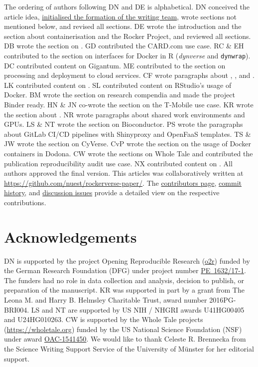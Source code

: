 The ordering of authors following DN and DE is alphabetical. DN
conceived the article idea,
\href{https://github.com/nuest/rockerverse-paper/issues/3}{initialised the formation of the writing team},
wrote sections not mentioned below, and revised all sections. DE wrote
the introduction and the section about containerisation and the Rocker
Project, and reviewed all sections. DB wrote the section on
. GD contributed the CARD.com use case. RC \& EH
contributed to the section on interfaces for Docker in R
(\emph{dynverse} and \texttt{dynwrap}). DC contributed content on
Gigantum. ME contributed to the section on processing and deployment to
cloud services. CF wrote paragraphs about ,
,  and . LK contributed content on
. SL contributed content on RStudio's usage of Docker. BM
wrote the section on research compendia and made the project Binder
ready. HN \& JN co-wrote the section on the T-Mobile use case. KR wrote
the section about . NR wrote paragraphs about shared work
environments and GPUs. LS \& NT wrote the section on Bioconductor. PS
wrote the paragraphs about GitLab CI/CD pipelines with Shinyproxy and
OpenFaaS templates. TS \& JW wrote the section on CyVerse. CvP wrote the
section on the usage of Docker containers in Dodona. CW wrote the
sections on Whole Tale and contributed the publication reproducibility
audit use case. NX contributed content on . All authors
approved the final version. This articles was collaboratively written at
\href{https://github.com/nuest/rockerverse-paper/}{https://github.com/nuest/rockerverse-paper/}.
The
\href{https://github.com/nuest/rockerverse-paper/graphs/contributors}{contributors page},
\href{https://github.com/nuest/rockerverse-paper/commits/master}{commit history},
and
\href{https://github.com/nuest/rockerverse-paper/issues/}{discussion issues}
provide a detailed view on the respective contributions.

\hypertarget{acknowledgements}{%
\section{Acknowledgements}\label{acknowledgements}}

DN is supported by the project Opening Reproducible Research
(\href{https://www.uni-muenster.de/forschungaz/project/12343}{o2r})
funded by the German Research Foundation (DFG) under project number
\href{https://gepris.dfg.de/gepris/projekt/415851837}{PE~1632/17-1}. The
funders had no role in data collection and analysis, decision to
publish, or preparation of the manuscript. KR was supported in part by a
grant from The Leona M. and Harry B. Helmsley Charitable Trust, award
number 2016PG-BRI004. LS and NT are supported by US NIH / NHGRI awards
U41HG00405 and U24HG010263. CW is supported by the Whole Tale projects
(\url{https://wholetale.org}) funded by the US National Science
Foundation (NSF) under award
\href{https://www.nsf.gov/awardsearch/showAward?AWD_ID=1541450}{OAC-1541450}.
We would like to thank Celeste R. Brennecka from the Science Writing
Support Service of the University of Münster for her editorial support.

